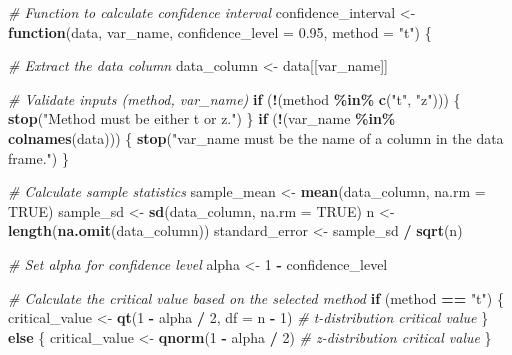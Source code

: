 \documentclass[
  11pt,
]{article}
\newenvironment{Shaded}{\begin{snugshade}}{\end{snugshade}}
\newcommand{\AttributeTok}[1]{\textcolor[rgb]{0.13,0.29,0.53}{#1}}
\newcommand{\CommentTok}[1]{\textcolor[rgb]{0.56,0.35,0.01}{\textit{#1}}}
\newcommand{\ConstantTok}[1]{\textcolor[rgb]{0.56,0.35,0.01}{#1}}
\newcommand{\ControlFlowTok}[1]{\textcolor[rgb]{0.13,0.29,0.53}{\textbf{#1}}}
\newcommand{\DecValTok}[1]{\textcolor[rgb]{0.00,0.00,0.81}{#1}}
\newcommand{\FloatTok}[1]{\textcolor[rgb]{0.00,0.00,0.81}{#1}}
\newcommand{\FunctionTok}[1]{\textcolor[rgb]{0.13,0.29,0.53}{\textbf{#1}}}
\newcommand{\NormalTok}[1]{#1}
\newcommand{\OtherTok}[1]{\textcolor[rgb]{0.56,0.35,0.01}{#1}}
\newcommand{\SpecialCharTok}[1]{\textcolor[rgb]{0.81,0.36,0.00}{\textbf{#1}}}
\newcommand{\StringTok}[1]{\textcolor[rgb]{0.31,0.60,0.02}{#1}}
\begin{document}
\begin{Shaded}
\begin{Highlighting}[]
\CommentTok{\# Function to calculate confidence interval}
\NormalTok{confidence\_interval }\OtherTok{\textless{}{-}} \ControlFlowTok{function}\NormalTok{(data, var\_name, }\AttributeTok{confidence\_level =} \FloatTok{0.95}\NormalTok{, }\AttributeTok{method =} \StringTok{"t"}\NormalTok{) \{}

  \CommentTok{\# Extract the data column}
\NormalTok{  data\_column }\OtherTok{\textless{}{-}}\NormalTok{ data[[var\_name]]}
  
  \CommentTok{\# Validate inputs (method, var\_name)}
  \ControlFlowTok{if}\NormalTok{ (}\SpecialCharTok{!}\NormalTok{(method }\SpecialCharTok{\%in\%} \FunctionTok{c}\NormalTok{(}\StringTok{"t"}\NormalTok{, }\StringTok{"z"}\NormalTok{))) \{}
    \FunctionTok{stop}\NormalTok{(}\StringTok{"Method must be either \textquotesingle{}t\textquotesingle{} or \textquotesingle{}z\textquotesingle{}."}\NormalTok{)}
\NormalTok{  \}}
  \ControlFlowTok{if}\NormalTok{ (}\SpecialCharTok{!}\NormalTok{(var\_name }\SpecialCharTok{\%in\%} \FunctionTok{colnames}\NormalTok{(data))) \{}
    \FunctionTok{stop}\NormalTok{(}\StringTok{"var\_name must be the name of a column in the data frame."}\NormalTok{)}
\NormalTok{  \}}
  
  \CommentTok{\# Calculate sample statistics}
\NormalTok{  sample\_mean }\OtherTok{\textless{}{-}} \FunctionTok{mean}\NormalTok{(data\_column, }\AttributeTok{na.rm =} \ConstantTok{TRUE}\NormalTok{)}
\NormalTok{  sample\_sd }\OtherTok{\textless{}{-}} \FunctionTok{sd}\NormalTok{(data\_column, }\AttributeTok{na.rm =} \ConstantTok{TRUE}\NormalTok{)}
\NormalTok{  n }\OtherTok{\textless{}{-}} \FunctionTok{length}\NormalTok{(}\FunctionTok{na.omit}\NormalTok{(data\_column))}
\NormalTok{  standard\_error }\OtherTok{\textless{}{-}}\NormalTok{ sample\_sd }\SpecialCharTok{/} \FunctionTok{sqrt}\NormalTok{(n)}
  
  \CommentTok{\# Set alpha for confidence level}
\NormalTok{  alpha }\OtherTok{\textless{}{-}} \DecValTok{1} \SpecialCharTok{{-}}\NormalTok{ confidence\_level}
  
  \CommentTok{\# Calculate the critical value based on the selected method}
  \ControlFlowTok{if}\NormalTok{ (method }\SpecialCharTok{==} \StringTok{"t"}\NormalTok{) \{}
\NormalTok{    critical\_value }\OtherTok{\textless{}{-}} \FunctionTok{qt}\NormalTok{(}\DecValTok{1} \SpecialCharTok{{-}}\NormalTok{ alpha }\SpecialCharTok{/} \DecValTok{2}\NormalTok{, }\AttributeTok{df =}\NormalTok{ n }\SpecialCharTok{{-}} \DecValTok{1}\NormalTok{)  }\CommentTok{\# t{-}distribution critical value}
\NormalTok{  \} }\ControlFlowTok{else}\NormalTok{ \{}
\NormalTok{    critical\_value }\OtherTok{\textless{}{-}} \FunctionTok{qnorm}\NormalTok{(}\DecValTok{1} \SpecialCharTok{{-}}\NormalTok{ alpha }\SpecialCharTok{/} \DecValTok{2}\NormalTok{)  }\CommentTok{\# z{-}distribution critical value}
\NormalTok{  \}}
  

\end{Highlighting}
\end{Shaded}
\end{document}

